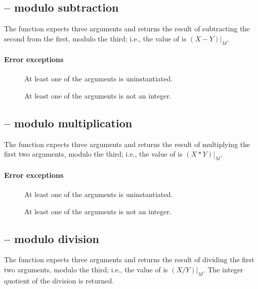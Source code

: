 \subsection{ -- modulo subtraction}
The  function expects three  arguments and returns the result of subtracting the second from the first, modulo the third; i.e., the value of  is $(X-Y)|_M$.
        
\paragraph{Error exceptions}
\begin{description}
\item[]
At least one of the arguments is uninstantiated.
\item[]
At least one of the arguments is not an integer.
\end{description}

\subsection{ -- modulo multiplication}
The  function expects three  arguments and returns the result of multiplying the first two arguments, modulo the third; i.e., the value of  is $(X*Y)|_M$.
        
\paragraph{Error exceptions}
\begin{description}
\item[]
At least one of the arguments is uninstantiated.
\item[]
At least one of the arguments is not an integer.
\end{description}

\subsection{ -- modulo division}
The  function expects three  arguments and returns the result of dividing the first two arguments, modulo the third; i.e., the value of  is $(X/Y)|_M$.
The integer quotient of the division is returned.
        
